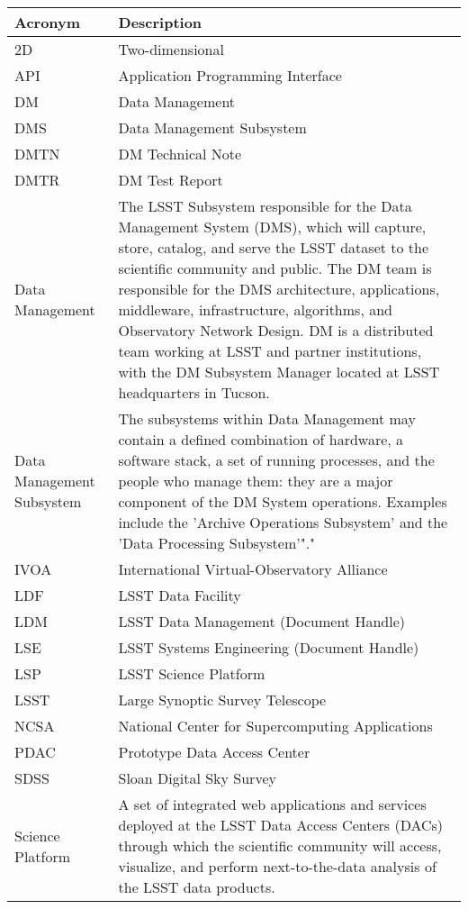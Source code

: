 \addtocounter{table}{-1}
\begin{longtable}{|p{}|p{}|}\hline
\textbf{Acronym} & \textbf{Description}  \\\hline

2D & Two-dimensional \\\hline
API & Application Programming Interface \\\hline
DM & Data Management \\\hline
DMS & Data Management Subsystem \\\hline
DMTN & DM Technical Note \\\hline
DMTR & DM Test Report \\\hline
Data Management & The LSST Subsystem responsible for the Data Management System (DMS), which will capture, store, catalog, and serve the LSST dataset to the scientific community and public. The DM team is responsible for the DMS architecture, applications, middleware, infrastructure, algorithms, and Observatory Network Design. DM is a distributed team working at LSST and partner institutions, with the DM Subsystem Manager located at LSST headquarters in Tucson. \\\hline
Data Management Subsystem & The subsystems within Data Management may contain a defined combination of hardware, a software stack, a set of running processes, and the people who manage them: they are a major component of the DM System operations. Examples include the 'Archive Operations Subsystem' and the 'Data Processing Subsystem'"." \\\hline
IVOA & International Virtual-Observatory Alliance \\\hline
LDF & LSST Data Facility \\\hline
LDM & LSST Data Management (Document Handle) \\\hline
LSE & LSST Systems Engineering (Document Handle) \\\hline
LSP & LSST Science Platform \\\hline
LSST & Large Synoptic Survey Telescope \\\hline
NCSA & National Center for Supercomputing Applications \\\hline
PDAC & Prototype Data Access Center \\\hline
SDSS & Sloan Digital Sky Survey \\\hline
Science Platform & A set of integrated web applications and services deployed at the LSST Data Access Centers (DACs) through which the scientific community will access, visualize, and perform next-to-the-data analysis of the LSST data products. \\\hline

\end{longtable}
